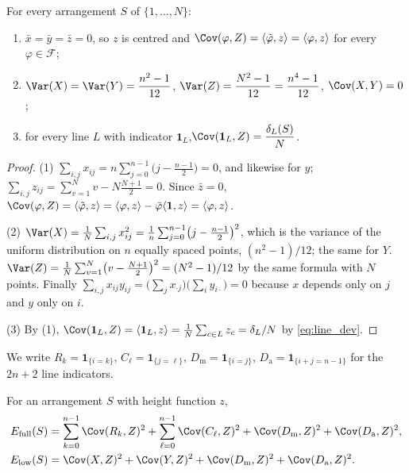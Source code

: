 \begin{lemma}
\label{lem:variances}
For every arrangement $S$ of $\{1,\dots,N\}$:
\begin{enumerate}
\item $\bar x=\bar y=\bar z=0$, so $z$ is centred and $\Cov(\varphi,Z)=\langle\tilde\varphi,z\rangle=\langle\varphi,z\rangle$ for every $\varphi\in\mathcal F$;
\item $\Var(X)=\Var(Y)=\dfrac{n^{2}-1}{12}$, \quad $\Var(Z)=\dfrac{N^{2}-1}{12}=\dfrac{n^{4}-1}{12}$, \quad $\Cov(X,Y)=0$;
\item for every line $L$ with indicator $\mathbf 1_L$,\quad $\Cov(\mathbf 1_L,Z)=\dfrac{\delta_L(S)}{N}$.
\end{enumerate}
\end{lemma}

\begin{proof}
(1) $\sum_{i,j}x_{ij}=n\sum_{j=0}^{n-1}\bigl(j-\frac{n-1}2\bigr)=0$, and likewise for $y$;
$\sum_{i,j}z_{ij}=\sum_{v=1}^{N}v-N\frac{N+1}2=0$.  Since $\bar z=0$,
$\Cov(\varphi,Z)=\langle\tilde\varphi,z\rangle=\langle\varphi,z\rangle-\bar\varphi\langle\mathbf 1,z\rangle=\langle\varphi,z\rangle$.

(2) $\Var(X)=\frac1N\sum_{i,j}x_{ij}^{2}=\frac1n\sum_{j=0}^{n-1}\bigl(j-\frac{n-1}2\bigr)^{2}$,
which is the variance of the uniform distribution on $n$ equally spaced points, $(n^{2}-1)/12$;
the same for $Y$.  $\Var(Z)=\frac1N\sum_{v=1}^{N}\bigl(v-\frac{N+1}2\bigr)^{2}=(N^{2}-1)/12$ by the same
formula with $N$ points.  Finally $\sum_{i,j}x_{ij}y_{ij}=\bigl(\sum_j x_{\cdot j}\bigr)\bigl(\sum_i y_{i\cdot}\bigr)=0$
because $x$ depends only on $j$ and $y$ only on $i$.

(3) By (1), $\Cov(\mathbf 1_L,Z)=\langle\mathbf 1_L,z\rangle=\frac1N\sum_{c\in L}z_c=\delta_L/N$ by \eqref{eq:line_dev}.
\end{proof}

We write $R_k=\mathbf 1_{\{i=k\}}$, $C_\ell=\mathbf 1_{\{j=\ell\}}$,
$D_{\mathrm{m}}=\mathbf 1_{\{i=j\}}$, $D_{\mathrm{a}}=\mathbf 1_{\{i+j=n-1\}}$ for the $2n+2$ line indicators.

\begin{definition}
\label{def:energies}
For an arrangement $S$ with height function $z$,
\begin{align}
E_{\mathrm{full}}(S)&=\sum_{k=0}^{n-1}\Cov(R_k,Z)^{2}+\sum_{\ell=0}^{n-1}\Cov(C_\ell,Z)^{2}
+\Cov(D_{\mathrm m},Z)^{2}+\Cov(D_{\mathrm a},Z)^{2},\label{eq:Efull}\\
E_{\mathrm{low}}(S)&=\Cov(X,Z)^{2}+\Cov(Y,Z)^{2}+\Cov(D_{\mathrm m},Z)^{2}+\Cov(D_{\mathrm a},Z)^{2}.\label{eq:Elow}
\end{align}
\end{definition}

